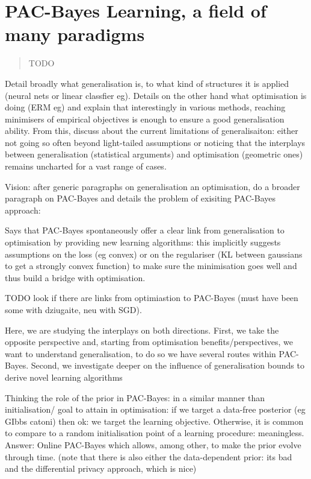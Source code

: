 \chapter[PAC-Bayes Learning, a field of many paradigms]{PAC-Bayes Learning, a field of many paradigms}
\label{chap:intro-pac-bayes}

\minitoc

\addchapterlof
\addchapterloa
\addchapterloe

\begin{abstract}
    TODO
\end{abstract}

\newpage

Detail broadly what generalisation is, to what kind of structures it is applied (neural nets or linear classfier eg). Details on the other hand what optimisation is doing (ERM eg) and explain that interestingly in various methods, reaching minimisers of empirical objectives is enough to ensure a good generalisation ability. From this, discuss about the current limitations of generalisaiton: either not going so often beyond light-tailed assumptions or noticing that the interplays between generalisation (statistical arguments) and optimisation (geometric ones) remains uncharted for a vast range of cases.

Vision: after generic paragraphs on generalisation an optimisation, do a broader paragraph on PAC-Bayes and details the problem of exisiting PAC-Bayes approach: 

Says that PAC-Bayes spontaneously offer a clear link from generalisation to optimisation by providing new learning algorithms: this implicitly suggests assumptions on the loss (eg convex) or on the regulariser (KL between gaussians to get a strongly convex function) to make sure the minimisation goes well and thus build a bridge with optimisation.

TODO look if there are links from optimiastion to PAC-Bayes (must have been some with dziugaite, neu with SGD).

Here, we are studying the interplays on both directions. First, we take the opposite perspective and, starting from optimisation benefits/perspectives, we want to understand generalisation, to do so we have several routes within PAC-Bayes. Second, we investigate deeper on the influence of generalisation bounds to derive novel learning algorithms

Thinking the role of the prior in PAC-Bayes: in a similar manner than initialisation/ goal to attain in optimisation: if we target a data-free posterior (eg GIbbs catoni) then ok: we target the learning objective. Otherwise, it is common to compare to a random initialisation point of a learning procedure: meaningless. Answer: Online PAC-Bayes which allows, among other, to make the prior evolve through time. (note that there is also either the data-dependent prior: its bad and the differential privacy approach, which is nice)

